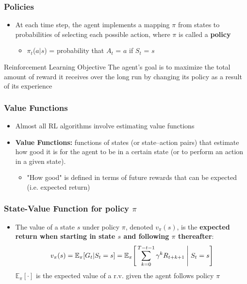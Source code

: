 \documentclass{beamer}
\begin{document}
\begin{frame}
\frametitle{Policies}
\begin{itemize}
\item At each time step, the agent implements a mapping $\pi$ from states to probabilities of selecting each possible action, where $\pi$ is called a \textbf{policy}
   \begin{itemize}
   	\item $\pi_t$($a|s$) = probability that $A_t$ = $a$ if $S_t$ = $s$
      \end{itemize}
\end{itemize}
\begin{block}{Reinforcement Learning Objective}
The agent's goal is to maximize the total amount of reward it receives over the long run by changing its policy as a result of its experience
\end{block}
\end{frame}


\begin{frame}
\frametitle{Value Functions}
\begin{itemize}
\item Almost all RL algorithms involve estimating value functions
\item \textbf{Value Functions:} functions of states (or state--action pairs) that estimate how good it is for the agent to be in a certain state (or to perform an action in a given state). 
   \begin{itemize}
   	\item "How good" is defined in terms of future rewards that can be expected (i.e. expected return)
      \end{itemize}
\end{itemize}
\end{frame}


\begin{frame}
\frametitle{State-Value Function for policy $\pi$}
\begin{itemize}
\item The value of a state $s$ under policy $\pi$, denoted $v_\pi(s)$, is the \textbf{expected return when starting in state $s$ and following $\pi$ thereafter}:
\begin{equation}
v_\pi(s) = \mathbb{E}_\pi[G_t | S_t = s] = \mathbb{E}_\pi\Bigg[\sum_{k=0}^{T-t-1} \gamma^k R_{t+k+1} \Biggm\lvert S_t = s \Bigg]
\nonumber
\end{equation}
$\mathbb{E}_\pi[\cdot]$ is the expected value of a r.v. given the agent follows policy $\pi$
\end{itemize}
\end{frame}
\end{document}
